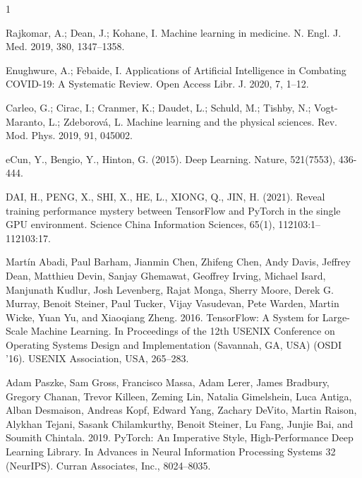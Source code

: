 \documentclass[conference]{IEEEtran}
\begin{document}
%
%
%
\renewcommand{\refname}{References}
\begin{thebibliography}{1}

Rajkomar, A.; Dean, J.; Kohane, I. Machine learning in medicine. N. Engl. J. Med. 2019, 380, 1347–1358.

Enughwure, A.; Febaide, I. Applications of Artificial Intelligence in Combating COVID-19: A Systematic Review. Open Access Libr. J. 2020, 7, 1–12.


Carleo, G.; Cirac, I.; Cranmer, K.; Daudet, L.; Schuld, M.; Tishby, N.; Vogt-Maranto, L.; Zdeborová, L. Machine learning and the physical sciences. Rev. Mod. Phys. 2019, 91, 045002. 


eCun, Y., Bengio, Y., Hinton, G. (2015). Deep Learning. Nature, 521(7553), 436-444. 

DAI, H., PENG, X., SHI, X., HE, L., XIONG, Q., JIN, H. (2021). Reveal training performance mystery between TensorFlow and PyTorch in the single GPU environment. Science China Information Sciences, 65(1), 112103:1–112103:17. 

Martín Abadi, Paul Barham, Jianmin Chen, Zhifeng Chen, Andy Davis, Jeffrey Dean, Matthieu Devin, Sanjay Ghemawat, Geoffrey
Irving, Michael Isard, Manjunath Kudlur, Josh Levenberg, Rajat Monga, Sherry Moore, Derek G. Murray, Benoit Steiner, Paul Tucker,
Vijay Vasudevan, Pete Warden, Martin Wicke, Yuan Yu, and Xiaoqiang Zheng. 2016. TensorFlow: A System for Large-Scale Machine
Learning. In Proceedings of the 12th USENIX Conference on Operating Systems Design and Implementation (Savannah, GA, USA) (OSDI
’16). USENIX Association, USA, 265–283.

Adam Paszke, Sam Gross, Francisco Massa, Adam Lerer, James Bradbury, Gregory Chanan, Trevor Killeen, Zeming Lin, Natalia
Gimelshein, Luca Antiga, Alban Desmaison, Andreas Kopf, Edward Yang, Zachary DeVito, Martin Raison, Alykhan Tejani, Sasank
Chilamkurthy, Benoit Steiner, Lu Fang, Junjie Bai, and Soumith Chintala. 2019. PyTorch: An Imperative Style, High-Performance Deep
Learning Library. In Advances in Neural Information Processing Systems 32 (NeurIPS). Curran Associates, Inc., 8024–8035.


\end{thebibliography}
\end{document}
